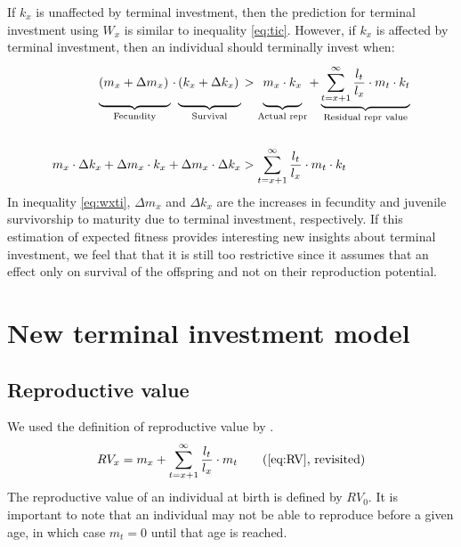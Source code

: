 \documentclass[12pt,review,authoryear]{elsarticle}
\begin{document}
If $k_x$ is unaffected by terminal investment, then the prediction for terminal investment using $W_{x}$ is similar to inequality \eqref{eq:tic}. However, if $k_x$ is affected by terminal investment, then an individual should terminally invest when:
\begin{equation}\label{eq:wxti}
\begin{split}
\def\tallest{\vphantom{\sum_{1}^{1} \frac{1}{1}}}
\underbrace{\left(m_{x} + \Delta m_{x}\right)\tallest}_{\text{Fecundity}} \cdot 
\underbrace{\left(k_{x} + \Delta k_{x}\right)\tallest}_{\text{Survival}} &> 
\def\tallest{\vphantom{\sum_{1}^{1} \frac{1}{1}}}
\underbrace{ m_{x} \cdot k_{x}\tallest }_{\text{Actual repr}} + 
\underbrace{ \sum_{t= x + 1}^{\infty} \frac{l_t}{l_x} \cdot m_t \cdot k_t}_{\text{Residual repr value}}
 \\ \\ 
m_x \cdot \Delta k_{x} + \Delta m_{x} \cdot k_x + \Delta m_{x} \cdot \Delta k_{x} &> \sum_{t= x + 1}^{\infty} \frac{l_t}{l_x} \cdot m_t \cdot k_t
\end{split}
\end{equation}
In inequality \ref{eq:wxti}, $\Delta m_{x}$ and $\Delta k_{x}$ are the increases in fecundity and juvenile survivorship to maturity due to terminal investment, respectively. If this estimation of expected fitness provides interesting new insights about terminal investment, we feel that that it is still too restrictive since it assumes that an effect only on survival of the offspring and not on their reproduction potential.



\section{New terminal investment model}
\subsection{Reproductive value}
We used the definition of reproductive value by \cite{Williams_Natural_1966}.
\begin{equation*}\label{eq:RVrev}
	RV_x = m_x + \sum_{t= x + 1}^{\infty} \frac{l_t}{l_x} \cdot m_t \tag{\ref{eq:RV}, revisited}
\end{equation*}
The reproductive value of an individual at birth is defined by $RV_{0}$. It is important to note that an individual may not be able to reproduce before a given age, in which case $m_{t}=0$ until that age is reached.
\end{document}
